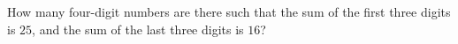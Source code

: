 How many four-digit numbers are there such that the sum of the first three digits is $25$, and the sum of the last three digits is $16$?
